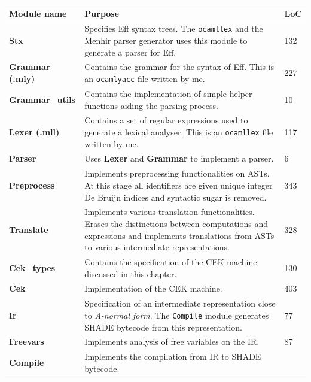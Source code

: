 \documentclass[class=article, crop=false]{standalone}
\begin{document}
\begin{table}[htb]
    \footnotesize
    \centering
    {\renewcommand{\arraystretch}{1.3}
    \begin{tabular}{lp{10cm}l}
    \toprule
    \textbf{Module name} & \textbf{Purpose} & \textbf{LoC} \\
    \midrule
    \textbf{Stx} & 
        Specifies Eff syntax trees. The \verb|ocamllex| and the Menhir parser
        generator uses this module to generate a parser for Eff. &
        132 \\
    \textbf{Grammar (.mly)} &
        Contains the grammar for the syntax of Eff. This is an \verb|ocamlyacc|
        file written by me. &
        227 \\
    \textbf{Grammar\_utils} &
        Contains the implementation of simple helper functions aiding the parsing process. &
        10 \\
    \textbf{Lexer (.mll)} &
        Contains a set of regular expressions used to generate a lexical analyser.
        This is an \verb|ocamllex| file written by me. &
        117 \\
    \textbf{Parser} &
        Uses \textbf{Lexer} and \textbf{Grammar} to implement a parser. &
        6 \\
    \textbf{Preprocess} &
        Implements preprocessing functionalities on ASTs. At this stage all
        identifiers are given unique integer De Bruijn indices and syntactic sugar is removed.  &
        343 \\
    \textbf{Translate} &
        Implements various translation functionalities. Erases the distinctions
        between computations and expressions and implements translations from
        ASTs to various intermediate representations. &
        328 \\
    \textbf{Cek\_types} & Contains the specification of the CEK machine
        discussed in this chapter. &
        130 \\
    \textbf{Cek} &
        Implementation of the CEK machine. &
        403 \\
    \textbf{Ir} &
        Specification of an intermediate representation close to \emph{A-normal
        form}. The \verb|Compile| module generates SHADE bytecode from this
        representation. &
        77 \\
    \textbf{Freevars} &
        Implements analysis of free variables on the IR. &
        87 \\
    \textbf{Compile} &
        Implements the compilation from IR to SHADE bytecode. &

\end{tabular}}
\end{table}
\end{document}
